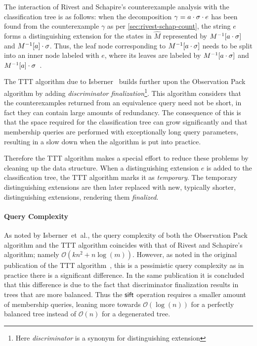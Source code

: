 \documentclass[multi,crop=false,class=article]{standalone}
\begin{document}
The interaction of Rivest and Schapire's counterexample analysis with the
classification tree is as follows: when the decomposition
$\gamma = a \cdot \sigma \cdot e$ has been found from the counterexample
$\gamma$ as per \cref{sec:rivest-schap-count}, the string $e$ forms a
distinguishing extension for the states in $\hat M$ represented by
$M^{-1}[a\cdot\sigma]$ and $M^{-1}[a]\cdot\sigma$. Thus, the leaf
node corresponding to $M^{-1}[a\cdot\sigma]$ needs to be split into an
inner node labeled with $e$, where its leaves are labeled by
$M^{-1}[a\cdot\sigma]$ and
$M^{-1}[a]\cdot\sigma$~\cite{Isberner2015a}.

The TTT algorithm due to Isberner~\cite{Isberner2014b} builds further upon the
Observation Pack algorithm by adding \textit{discriminator
  finalization}\footnote{Here \textit{discriminator} is a synonym for
  distinguishing extension}. This algorithm considers that the counterexamples
returned from an equivalence query need not be short, in fact they can contain
large amounts of redundancy. The consequence of this is that the space required
for the classification tree can grow significantly and that membership queries
are performed with exceptionally long query parameters, resulting in a slow down
when the algorithm is put into practice.

Therefore the TTT algorithm makes a special effort to reduce these problems by
cleaning up the data structure. When a distinguishing extension $e$ is added to
the classification tree, the TTT algorithm marks it as \textit{temporary}. The
temporary distinguishing extensions are then later replaced with new, typically
shorter, distinguishing extensions, rendering them \textit{finalized}.

\paragraph{Query Complexity} As noted by Isberner~et~al., the query complexity
of both the Observation Pack algorithm and the TTT algorithm coincides with that
of Rivest and Schapire's algorithm; namely $\mathcal{O}(kn^2 + n
\log(m))$. However, as noted in the original publication of the TTT
algorithm~\cite{Isberner2014b}, this is a pessimistic query complexity as in
practice there is a significant difference. In the same publication it is
concluded that this difference is due to the fact that discriminator
finalization results in trees that are more balanced. Thus the $\mathsf{sift}$ operation
requires a smaller amount of membership queries, leaning more towards
$\mathcal{O}(\log(n))$ for a perfectly balanced tree instead of $\mathcal{O}(n)$
for a degenerated tree.
\end{document}
